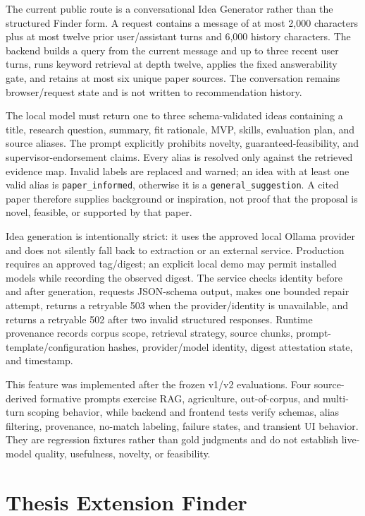 The current public  route is a conversational Idea Generator rather than the structured Finder form. A request contains a message of at most 2,000 characters plus at most twelve prior user/assistant turns and 6,000 history characters. The backend builds a query from the current message and up to three recent user turns, runs keyword retrieval at depth twelve, applies the fixed answerability gate, and retains at most six unique paper sources. The conversation remains browser/request state and is not written to recommendation history.

The local model must return one to three schema-validated ideas containing a title, research question, summary, fit rationale, MVP, skills, evaluation plan, and source aliases. The prompt explicitly prohibits novelty, guaranteed-feasibility, and supervisor-endorsement claims. Every alias is resolved only against the retrieved evidence map. Invalid labels are replaced and warned; an idea with at least one valid alias is \texttt{paper\_informed}, otherwise it is a \texttt{general\_suggestion}. A cited paper therefore supplies background or inspiration, not proof that the proposal is novel, feasible, or supported by that paper.

Idea generation is intentionally strict: it uses the approved local Ollama provider and does not silently fall back to extraction or an external service. Production requires an approved tag/digest; an explicit local demo may permit installed models while recording the observed digest. The service checks identity before and after generation, requests JSON-schema output, makes one bounded repair attempt, returns a retryable 503 when the provider/identity is unavailable, and returns a retryable 502 after two invalid structured responses. Runtime provenance records corpus scope, retrieval strategy, source chunks, prompt-template/configuration hashes, provider/model identity, digest attestation state, and timestamp.

This feature was implemented after the frozen v1/v2 evaluations. Four source-derived formative prompts exercise RAG, agriculture, out-of-corpus, and multi-turn scoping behavior, while backend and frontend tests verify schemas, alias filtering, provenance, no-match labeling, failure states, and transient UI behavior. They are regression fixtures rather than gold judgments and do not establish live-model quality, usefulness, novelty, or feasibility.

\section{Thesis Extension Finder}

